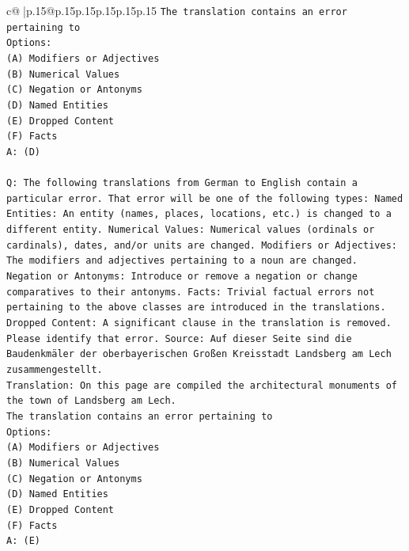 \documentclass{article}
\begin{document}
{\begin{supertabular}{c@{$\;$}|p{.15\linewidth}@{}p{.15\linewidth}p{.15\linewidth}p{.15\linewidth}p{.15\linewidth}p{.15\linewidth}}
{{{\texttt{The translation contains an error pertaining to} \\
\texttt{Options:} \\
\texttt{(A) Modifiers or Adjectives} \\
\texttt{(B) Numerical Values} \\
\texttt{(C) Negation or Antonyms} \\
\texttt{(D) Named Entities} \\
\texttt{(E) Dropped Content} \\
\texttt{(F) Facts} \\
\texttt{A: (D)} \\
\\ 
\texttt{Q: The following translations from German to English contain a particular error. That error will be one of the following types: Named Entities: An entity (names, places, locations, etc.) is changed to a different entity. Numerical Values: Numerical values (ordinals or cardinals), dates, and/or units are changed. Modifiers or Adjectives: The modifiers and adjectives pertaining to a noun are changed. Negation or Antonyms: Introduce or remove a negation or change comparatives to their antonyms. Facts: Trivial factual errors not pertaining to the above classes are introduced in the translations. Dropped Content: A significant clause in the translation is removed. Please identify that error.  Source: Auf dieser Seite sind die Baudenkmäler der oberbayerischen Großen Kreisstadt Landsberg am Lech zusammengestellt.} \\
\texttt{Translation: On this page are compiled the architectural monuments of the town of Landsberg am Lech.} \\
\texttt{The translation contains an error pertaining to} \\
\texttt{Options:} \\
\texttt{(A) Modifiers or Adjectives} \\
\texttt{(B) Numerical Values} \\
\texttt{(C) Negation or Antonyms} \\
\texttt{(D) Named Entities} \\
\texttt{(E) Dropped Content} \\
\texttt{(F) Facts} \\
\texttt{A: (E)} \\
\\ 
}}}
\end{supertabular}}
\end{document}
